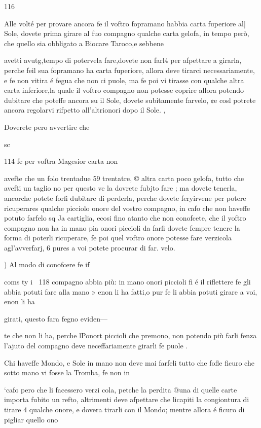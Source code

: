 \documentclass[11pt,a6paper]{article}
\begin{document}
116

Alle volté per provare ancora fe il voftro fopramano
habbia carta fuperiore al] Sole,
dovete prima girare al fuo compagno qualche carta gelofa, in
tempo però, che quello sia obbligato
a Biocare Taroco,e sebbene

avetti avutg,tempo di potervela
fare,dovete non farl4 per afpettare a girarla, perche feil sua
fopramano ha carta fuperiore,
allora deve tirarci necessariamente, e fe non vitira é fegua
che non ci puole, ma fe poi vi
tirasse con qualche altra carta
inferiore,la quale il voftro compagno non potesse coprire allora potendo dubitare che poteffe
ancora su il Sole, dovete subitamente farvelo, ¢e cosl potrete
ancora regolarvi rifpetto all’altrionori dopo il Sole. ,

Doverete pero avvertire che

sc
 

114
fe per voftra Magesior carta non

avefte che un folo trentadue 59
trentatre, © altra carta poco
gelofa, tutto che avefti un taglio
no per questo ve la dovrete fubjto fare ; ma dovete tenerla, ancorche potete forfi dubitare di
perderla, perche dovete feryirvene per potere ricuperares
qualche picciolo onore del vostro compagno, in cafo che non
haveffe potuto farfelo sq Ja cartiglia, ecosi fino atanto che
non conofcete, che il yoftro
compagno non ha in mano pia
onori piccioli da farfi dovete
fempre tenere la forma di poterli ricuperare, fe poi quel
voftro onore potesse fare verzicola agl’avverfarj, 6 pures
a voi potete procurar di far.
velo.

) Al modo di conofcere fe if

coms
ty i
118
compagno abbia più: in mano
onori piccioli fi é il riflettere fe
gli abbia potuti fare alla mano »
enon li ha fatti,o pur fe li abbia
potuti girare a voi, enon li ha

girati, questo fara fegno eviden—

te che non li ha, perche lPonort
piccioli che premono, non potendo più farli fenza l’ajuto del
compagno deve neceffariamente girarli fe puole .

Chi haveffe Mondo, e Sole in
mano non deve mai farfeli tutto
che fofle ficuro che sotto mano
vi fosse la Tromba, fe non in

‘cafo pero che li facessero verzi
cola, petche la perdita @una di
quelle carte importa fubito un
refto, altrimenti deve afpettare
che licapiti la congiontura di
tirare 4 qualche onore, e dovera tirarli con il Mondo; mentre
allora é ficuro di pigliar quello
ono  
\end{document}
